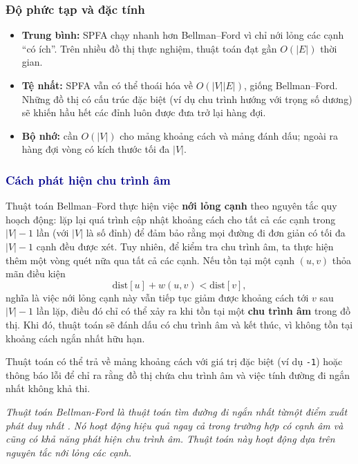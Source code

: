 \documentclass[14pt,a4paper]{report}
\begin{document}
\subsubsection{Độ phức tạp và đặc tính}

\begin{itemize}
    \item \textbf{Trung bình:} SPFA chạy nhanh hơn Bellman--Ford vì chỉ nới lỏng các cạnh ``có ích''. Trên nhiều đồ thị thực nghiệm, thuật toán đạt gần $O(|E|)$ thời gian.
    \item \textbf{Tệ nhất:} SPFA vẫn có thể thoái hóa về $O(|V||E|)$, giống Bellman--Ford. Những đồ thị có cấu trúc đặc biệt (ví dụ chu trình hướng với trọng số dương) sẽ khiến hầu hết các đỉnh luôn được đưa trở lại hàng đợi.
    \item \textbf{Bộ nhớ:} cần $O(|V|)$ cho mảng khoảng cách và mảng đánh dấu; ngoài ra hàng đợi vòng có kích thước tối đa $|V|$.
\end{itemize}


\subsubsection{\textcolor{darkblue}{Cách phát hiện chu trình âm}}

Thuật toán Bellman--Ford thực hiện việc \textbf{nới lỏng cạnh} theo nguyên tắc quy hoạch động: lặp lại quá trình cập nhật khoảng cách cho tất cả các cạnh trong $|V|-1$ lần (với $|V|$ là số đỉnh) để đảm bảo rằng mọi đường đi đơn giản có tối đa $|V|-1$ cạnh đều được xét. Tuy nhiên, để kiểm tra chu trình âm, ta thực hiện thêm một vòng quét nữa qua tất cả các cạnh. Nếu tồn tại một cạnh $(u,v)$ thỏa mãn điều kiện
\[
\text{dist}[u] + w(u,v) < \text{dist}[v],
\]
nghĩa là việc nới lỏng cạnh này vẫn tiếp tục giảm được khoảng cách tới $v$ sau $|V|-1$ lần lặp, điều đó chỉ có thể xảy ra khi tồn tại một \textbf{chu trình âm} trong đồ thị. Khi đó, thuật toán sẽ đánh dấu có chu trình âm và kết thúc, vì không tồn tại khoảng cách ngắn nhất hữu hạn.

Thuật toán có thể trả về mảng khoảng cách với giá trị đặc biệt (ví dụ \texttt{-1}) hoặc thông báo lỗi để chỉ ra rằng đồ thị chứa chu trình âm và việc tính đường đi ngắn nhất không khả thi.

\begin{tcolorbox}
    \textit{Thuật toán Bellman-Ford là thuật toán tìm đường đi ngắn nhất từ ​​một điểm xuất phát duy nhất . Nó hoạt động hiệu quả ngay cả trong trường hợp có cạnh âm và cũng có khả năng phát hiện chu trình âm. Thuật toán này hoạt động dựa trên nguyên tắc nới lỏng các cạnh.}
\end{tcolorbox}
\end{document}

